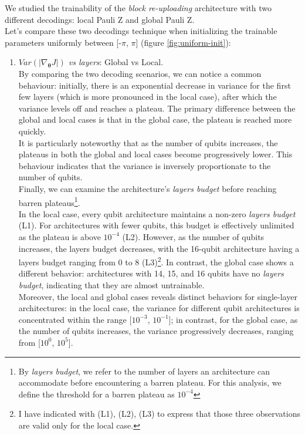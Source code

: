 We studied the trainability of the \textit{block re-uploading} architecture with two different decodings:
local Pauli Z and global Pauli Z.\\ 
Let's compare these two decodings technique when initializing the trainable parameters uniformly 
between [-$\pi$, $\pi$] (figure \ref{fig:uniform-init}):

\begin{enumerate}
    \item \textit{$Var(|\nabla_{\bm{\theta}}J|)$ vs layers}: Global vs Local.\\
    By comparing the two decoding scenarios, we can notice a common behaviour:
    initially, there is an exponential decrease in variance for the first few layers (which is more pronounced 
    in the local case), after which the variance levels off and reaches a plateau.
    The primary difference between the global and local cases is that in the global case, 
    the plateau is reached more quickly.\\
    It is particularly noteworthy that as the number of qubits increases, 
    the plateaus in both the global and local cases become progressively lower.
    This behaviour indicates that the variance is inversely proportionate to the number of qubits.\\
    Finally, we can examine the architecture’s \textit{layers budget} before reaching barren 
    plateaus\footnote[1]{By \textit{layers budget}, we refer to the number of layers an architecture 
    can accommodate before encountering a barren plateau. For this analysis, we define the 
    threshold for a barren plateau as $10^{-4}$}.\\
    In the local case, every qubit architecture maintains 
    a non-zero \textit{layers budget} (L1). For architectures with fewer qubits, this budget is effectively 
    unlimited as the plateau is above $10^{-4}$ (L2). However, as the number of qubits increases, 
    the layers budget decreases, with the 16-qubit architecture having a layers budget ranging from 
    0 to 8 (L3)\footnote[2]{I have indicated with (L1), (L2), (L3) to express that those three 
    observations are valid only for the local case.}. 
    In contrast, the global case shows a different behavior: architectures with 14, 15, and 
    16 qubits have no \textit{layers budget}, indicating that they are almost untrainable.\\
    Moreover, the local and global cases reveals distinct behaviors for single-layer architectures: 
    in the local case, the variance for different qubit architectures is concentrated within the range 
    [$10^{-3}$, $10^{-1}$]; in contrast, for the global case, as the number of qubits increases, 
    the variance progressively decreases, ranging from [$10^0$, $10^5$].


\end{enumerate}
